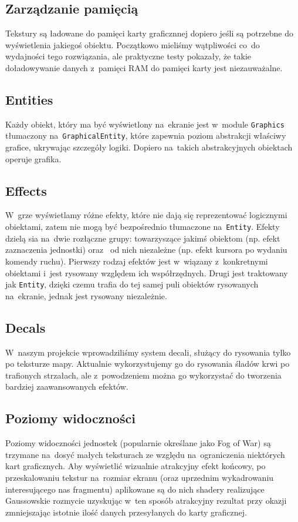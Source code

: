 \documentclass[licencjacka]{pracamgr}
\begin{document}
    \subsection{Zarządzanie pamięcią}
      Tekstury są ładowane do pamięci karty graficznnej dopiero jeśli są potrzebne do wyświetlenia jakiegoś
      obiektu. Początkowo mieliśmy wątpliwości co~do wydajności tego rozwiązania, ale praktyczne testy pokazały, że
      takie doładowywanie danych z~pamięci RAM do pamięci karty jest niezauważalne.

    \subsection{Entities}
      Każdy obiekt, który ma być wyświetlony na~ekranie jest w~module \texttt{Graphics} tłumaczony na~\texttt{GraphicalEntity}, które
      zapewnia poziom abstrakcji właściwy grafice, ukrywając szczegóły logiki. Dopiero na~takich abstrakcyjnych obiektach operuje grafika.

    \subsection{Effects}
      W~grze wyświetlamy różne efekty, które nie dają się reprezentować logicznymi obiektami, zatem nie mogą być bezpośrednio tłumaczone
      na~\texttt{Entity}. Efekty dzielą sia na~dwie rozłączne grupy: towarzyszące jakimś obiektom (np. efekt zaznaczenia jednostki) oraz~ 
      od nich niezależne (np. efekt kursora po wydaniu komendy ruchu). Pierwszy rodzaj efektów jest w~wiązany z~konkretnymi obiektami i~jest
      rysowany względem ich współrzędnych. Drugi jest traktowany jak \texttt{Entity}, dzięki czemu trafia do tej samej puli obiektów rysowanych
      na~ekranie, jednak jest rysowany niezależnie.

    \subsection{Decals}
      W~naszym projekcie wprowadziliśmy system decali, służący do rysowania tylko po teksturze mapy. Aktualnie wykorzystujemy go do
      rysowania śladów krwi po trafionych strzałach, ale z~powodzeniem można go wykorzystać do tworzenia bardziej zaawansowanych efektów.

    \subsection{Poziomy widoczności}
      Poziomy widoczności jednostek (popularnie określane jako Fog of War) są trzymane na~dosyć małych teksturach ze względu na~ograniczenia
      niektórych kart graficznych. Aby wyświetlić wizualnie atrakcyjny efekt końcowy, po przeskalowaniu tekstur na~rozmiar ekranu
      (oraz uprzednim wykadrowaniu interesującego nas fragmentu) aplikowane są do nich shadery realizujące Gaussowskie rozmycie\cite{GB}
      uzyskując w~ten sposób atrakcyjny rezultat przy okazji zmniejszając istotnie ilość danych przesyłanych do karty graficznej.
\end{document}
